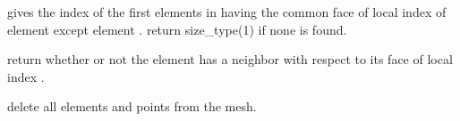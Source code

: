 \documentclass[a4paper,11pt,english]{sphinxmanual}
\begin{document}

\begin{fulllineitems}
\label{\detokenize{userdoc/bmesh:_CPPv4N6getfem4mesh18neighbor_of_convexE2ic1f}}%
\pysigstartmultiline
{}%
\pysigstopmultiline
gives the index of the first elements in  having the common
face of local index  of element  except element .
return size\_type(\sphinxhyphen{}1) if none is found.

\end{fulllineitems}


\begin{fulllineitems}
\label{\detokenize{userdoc/bmesh:_CPPv4N6getfem4mesh25is_convex_having_neighborE2ic1f}}%
\pysigstartmultiline
{}%
\pysigstopmultiline
return whether or not the element  has a neighbor with respect
to its face of local index .

\end{fulllineitems}


\begin{fulllineitems}
\label{\detokenize{userdoc/bmesh:_CPPv4N6getfem4mesh5clearEv}}%
\pysigstartmultiline
{}%
\pysigstopmultiline
delete all elements and points from the mesh.

\end{fulllineitems}

\end{document}
